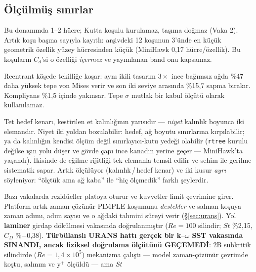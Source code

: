 \documentclass[11pt,a4paper]{article}
\begin{document}
\subsection{Ölçülmüş sınırlar}

\begin{description}\setlength\itemsep{1pt}
  \item[İnce firar kenarı.] Bu donanımda 1--2 hücre; Kutta koşulu kurulamaz,
        taşıma doğmaz (Vaka 2). Artık koşu başına sayıyla kayıtlı: arşivdeki 12
        koşunun 3'ünde en küçük geometrik özellik yüzey hücresinden küçük
        (MiniHawk 0{,}17 hücre/özellik). Bu koşuların $C_d$'si o özelliği
        \emph{içermez} ve yayımlanan band onu kapsamaz.
  \item[TO tepe gerilmesi.] Reentrant köşede tekilliğe koşar: aynı ikili tasarım
        $3\times$ ince bağımsız ağda \%47 daha yüksek tepe von Mises verir ve son
        iki seviye arasında \%15{,}7 sapma bırakır. Kompliyans \%1{,}5 içinde
        yakınsar. Tepe $\sigma$ mutlak bir kabul ölçütü olarak kullanılamaz.
  \item[İnce özelliğin FEA ağındaki temsili.] Tet hedef kenarı, kestirilen et
        kalınlığının yarısıdır --- \emph{niyet} kalınlık boyunca iki elemandır.
        Niyet iki yoldan bozulabilir: hedef, ağ boyutu sınırlarına kırpılabilir;
        ya da kalınlığın kendisi ölçüm değil sınırlayıcı-kutu yedeği olabilir
        (\texttt{rtree} kurulu değilse ışın yolu düşer ve gövde çapı ince
        kanadın yerine geçer --- MiniHawk'ta yaşandı). İkisinde de eğilme
        rijitliği tek elemanla temsil edilir ve sehim ile gerilme sistematik
        sapar. Artık ölçülüyor (kalınlık\,/\,hedef kenar) ve iki kusur
        \emph{ayrı} söyleniyor: ``ölçtük ama ağ kaba'' ile ``hiç ölçmedik''
        farklı şeylerdir.
  \item[Kararlı-RANS uygunluğu ve zaman-çözünür yolun kapsamı.] Bazı
        vakalarda rezidüeller platoya oturur ve kuvvetler limit çevrimine
        girer. Platform artık zaman-çözünür PIMPLE koşumunu \emph{destekler}
        ve salınan koşuya zaman adımı, adım sayısı ve o ağdaki tahmini süreyi
        verir (\S\ref{sec:urans}). Yol \textbf{laminer} girdap dökülmesi
        vakasında doğrulanmıştır ($Re{=}100$ silindir; $St$ \%2{,}15,
        $C_D$ \%$-$0{,}38). \textbf{Türbülanslı URANS hattı gerçek bir k--$\omega$ SST vakasında
        SINANDI, ancak fiziksel doğrulama ölçütünü GEÇEMEDİ}: 2B subkritik
        silindirde ($Re{=}1{,}4\times10^5$) mekanizma çalıştı --- model
        zaman-çözünür çevrimde koştu, salınım ve y$^+$ ölçüldü --- ama $St$

\end{description}
\end{document}
